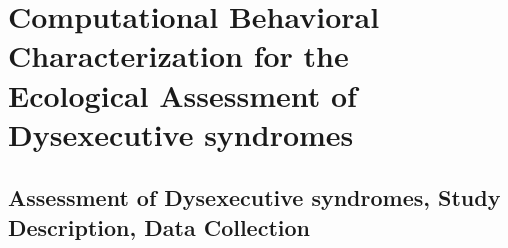\part[Computational behavioral characterization for the ecological assessment of dysexecutive syndromes]{Computational Behavioral Characterization for the \\Ecological Assessment of Dysexecutive syndromes}
\label{part:part_2}


\chapter[Assessment of dysexecutive syndromes, study description, data collection]{Assessment of Dysexecutive syndromes, Study Description, Data Collection}
\label{sec:chapter_4}

        


